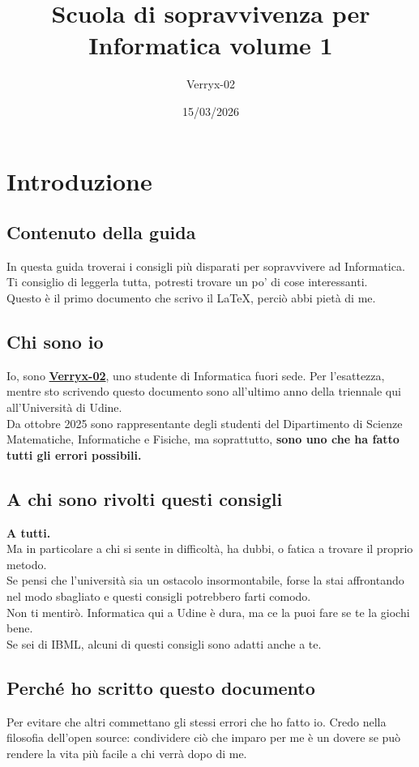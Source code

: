 \documentclass[18pt]{extarticle}
\title{Scuola di sopravvivenza per Informatica volume 1}
\author{Verryx-02}
\date{15/03/2026}
\begin{document}
\maketitle

\tableofcontents
\newpage

\section{Introduzione}

\subsection{Contenuto della guida}
In questa guida troverai i consigli più disparati per sopravvivere ad Informatica. Ti consiglio di leggerla tutta, potresti trovare un po' di cose interessanti.\\
Questo è il primo documento che scrivo il \LaTeX, perciò abbi pietà di me.

\subsection{Chi sono io}
Io, sono \href{https://github.com/Verryx-02}{\textbf{Verryx-02}}, uno studente di Informatica fuori sede. 
Per l'esattezza, mentre sto scrivendo questo documento sono all'ultimo anno della triennale qui all'Università di Udine.\\
Da ottobre 2025 sono rappresentante degli studenti del Dipartimento di Scienze Matematiche, Informatiche e Fisiche, ma soprattutto, \textbf{sono uno che ha fatto tutti gli errori possibili.}


\subsection{A chi sono rivolti questi consigli}
\textbf{A tutti.}\\
Ma in particolare a chi si sente in difficoltà, ha dubbi, o fatica a trovare il proprio metodo.\\
Se pensi che l'università sia un ostacolo insormontabile, forse la stai affrontando nel modo sbagliato e questi consigli potrebbero farti comodo.\\
Non ti mentirò. Informatica qui a Udine è dura, ma ce la puoi fare se te la giochi bene.\\
Se sei di IBML, alcuni di questi consigli sono adatti anche a te.


\subsection{Perché ho scritto questo documento}
Per evitare che altri commettano gli stessi errori che ho fatto io.  
Credo nella filosofia dell’open source: condividere ciò che imparo per me è un dovere se può rendere la vita più facile a chi verrà dopo di me.
\end{document}
